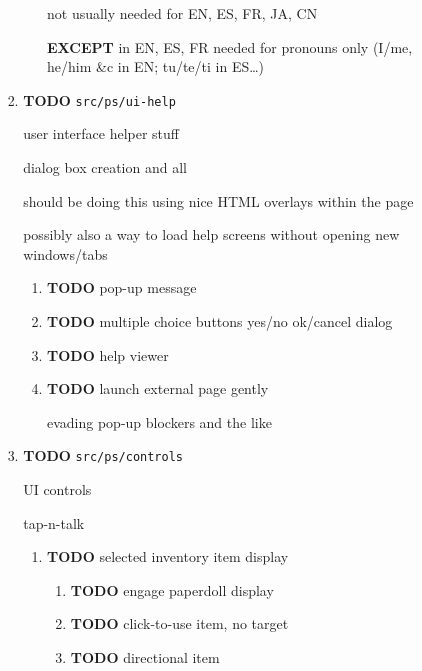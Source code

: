 \documentclass[11pt]{article}
\begin{document}
\begin{enumerate}
\begin{enumerate}
\begin{enumerate}
\begin{enumerate}
\begin{enumerate}
not usually needed for EN, ES, FR, JA, CN 

\textbf{EXCEPT} in EN, ES, FR needed for pronouns only (I/me, he/him \&c in
EN; tu/te/ti in ES…)
\end{enumerate}
\item {\bfseries\sffamily TODO} \texttt{src/ps/ui-help}
\label{sec-5-4-1-4-2-8}

user interface helper stuff

dialog box creation and all

should be doing this using nice HTML overlays within the page

possibly also a way to load help screens without opening new
windows/tabs

\begin{enumerate}
\item {\bfseries\sffamily TODO} pop-up message
\label{sec-5-4-1-4-2-8-1}

\item {\bfseries\sffamily TODO} multiple choice buttons yes/no ok/cancel dialog
\label{sec-5-4-1-4-2-8-2}

\item {\bfseries\sffamily TODO} help viewer
\label{sec-5-4-1-4-2-8-3}

\item {\bfseries\sffamily TODO} launch external page gently
\label{sec-5-4-1-4-2-8-4}

evading pop-up blockers and the like
\end{enumerate}
\item {\bfseries\sffamily TODO} \texttt{src/ps/controls}
\label{sec-5-4-1-4-2-9}

UI controls

tap-n-talk

\begin{enumerate}
\item {\bfseries\sffamily TODO} selected inventory item display
\label{sec-5-4-1-4-2-9-1}

\begin{enumerate}
\item {\bfseries\sffamily TODO} engage paperdoll display
\label{sec-5-4-1-4-2-9-1-1}

\item {\bfseries\sffamily TODO} click-to-use item, no target
\label{sec-5-4-1-4-2-9-1-2}

\item {\bfseries\sffamily TODO} directional item
\label{sec-5-4-1-4-2-9-1-3}


\end{enumerate}
\end{enumerate}
\end{enumerate}
\end{enumerate}
\end{enumerate}
\end{enumerate}
\end{document}
